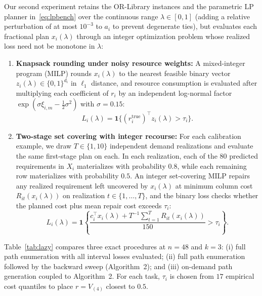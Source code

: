\documentclass[a4paper,10pt]{article}
\theoremstyle{plain}
\theoremstyle{remark}
\begin{document}
Our second experiment retains the OR-Library instances and the parametric LP planner in~\eqref{eq:lpbench} over the continuous range $\lambda\in[0,1]$ (adding a relative perturbation of at most $10^{-3}$ to $a_i$ to prevent degenerate ties), but evaluates each fractional plan $x_i(\lambda)$ through an integer optimization problem whose realized loss need not be monotone in $\lambda$:
\begin{enumerate}
\setlength{\itemsep}{2pt}\setlength{\topsep}{3pt}
\item \textbf{Knapsack rounding under noisy resource weights:} A mixed-integer program (MILP) rounds $x_i(\lambda)$ to the nearest feasible binary vector $z_i(\lambda)\in\{0,1\}^{d_i}$ in $\ell_1$ distance, and resource consumption is evaluated after multiplying each coefficient of $r_i$ by an independent log-normal factor $\exp(\sigma\xi_{i,m}-\tfrac12\sigma^2)$ with $\sigma=0.15$:
\begin{equation}\label{eq:knap-loss}
 L_i(\lambda)=\mathbf1\bigl\{(r_i^{\mathrm{true}})^\top z_i(\lambda)>\tau_i\bigr\}.
\end{equation}
\item \textbf{Two-stage set covering with integer recourse:} For each calibration example, we draw $T\in\{1,10\}$ independent demand realizations and evaluate the same first-stage plan on each. In each realization, each of the $80$ predicted requirements in $X_i$ materializes with probability $0.8$, while each remaining row materializes with probability $0.5$. An integer set-covering MILP repairs any realized requirement left uncovered by $x_i(\lambda)$ at minimum column cost $R_{it}(x_i(\lambda))$ on realization $t\in\{1,\ldots,T\}$, and the binary loss checks whether the planned cost plus mean repair cost exceeds $\tau_i$:
\begin{equation}\label{eq:cover-loss}
 L_i(\lambda)=\mathbf1\left\{
 \frac{c_i^\top x_i(\lambda)+T^{-1}\sum_{t=1}^T R_{it}(x_i(\lambda))}{150}
 >\tau_i\right\}.
\end{equation}
\end{enumerate}

Table~\ref{tab:lazy} compares three exact procedures at $n=48$ and $k=3$: (i) full path enumeration with all interval losses evaluated; (ii) full path enumeration followed by the backward sweep (Algorithm~2); and (iii) on-demand path generation coupled to Algorithm~2. For each task, $\tau_i$ is chosen from $17$ empirical cost quantiles to place $r=V_{(4)}$ closest to $0.5$.
\end{document}
